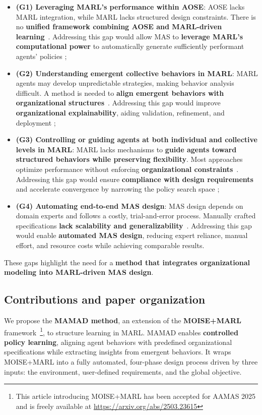 \documentclass[pdflatex,sn-mathphys-num]{sn-jnl}%
\theoremstyle{thmstyleone}%
\theoremstyle{thmstyletwo}%
\theoremstyle{thmstylethree}%
\begin{document}
\begin{itemize}
    \item \textbf{(G1) Leveraging MARL's performance within AOSE}: AOSE lacks MARL integration, while MARL lacks structured design constraints. There is no \textbf{unified framework combining AOSE and MARL-driven learning}~\cite{Cossentino2014}. Addressing this gap would allow MAS to \textbf{leverage MARL's computational power} to automatically generate sufficiently performant agents' policies ;
          
    \item \textbf{(G2) Understanding emergent collective behaviors in MARL}: MARL agents may develop unpredictable strategies, making behavior analysis difficult. A method is needed to \textbf{align emergent behaviors with organizational structures}~\cite{Du2022, Papoudakis2021}. Addressing this gap would improve \textbf{organizational explainability}, aiding validation, refinement, and deployment ;
          
    \item \textbf{(G3) Controlling or guiding agents at both individual and collective levels in MARL}: MARL lacks mechanisms to \textbf{guide agents toward structured behaviors while preserving flexibility}. Most approaches optimize performance without enforcing \textbf{organizational constraints}~\cite{Oroojlooy2023}. Addressing this gap would ensure \textbf{compliance with design requirements} and accelerate convergence by narrowing the policy search space ;
          
    \item \textbf{(G4) Automating end-to-end MAS design}: MAS design depends on domain experts and follows a costly, trial-and-error process. Manually crafted specifications \textbf{lack scalability and generalizability}~\cite{Nguyen2020}. Addressing this gap would enable \textbf{automated MAS design}, reducing expert reliance, manual effort, and resource costs while achieving comparable results.
\end{itemize}
%
These gaps highlight the need for a \textbf{method that integrates organizational modeling into MARL-driven MAS design}.

\subsection{Contributions and paper organization}

We propose the \textbf{MAMAD method}, an extension of the \textbf{MOISE+MARL} framework~\cite{soule2025moisemarl}\footnote{This article introducing MOISE+MARL has been accepted for AAMAS 2025 and is freely available at \url{https://arxiv.org/abs/2503.23615}}, to structure learning in MARL. MAMAD enables \textbf{controlled policy learning}, aligning agent behaviors with predefined organizational specifications while extracting insights from emergent behaviors. It wraps MOISE+MARL into a fully automated, four-phase design process driven by three inputs: the environment, user-defined requirements, and the global objective.
\end{document}
